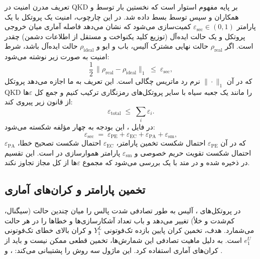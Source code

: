 تعریف مدرن امنیت در QKD بر پایه مفهوم  استوار است که نخستین بار توسط  و همکاران و سپس توسط  بسط داده شد. در این چارچوب، امنیت یک پروتکل با یک پارامتر $\varepsilon_{\text{sec}} \in (0,1)$ کمیت‌سازی می‌شود که نشان می‌دهد فاصله آماری میان خروجی پروتکل و یک حالت ایده‌آل (توزیع کلید یکنواخت و مستقل از اطلاعات دشمن) چقدر است. اگر $\rho_{\text{real}}$ حالت نهایی مشترک آلیس، باب و ایو و $\rho_{\text{ideal}}$ حالت ایده‌آل باشد، شرط امنیت به صورت زیر نوشته می‌شود:
\begin{equation}
	\frac{1}{2}\,\|\rho_{\text{real}} - \rho_{\text{ideal}}\|_1 \;\le\; \varepsilon_{\text{sec}},
\end{equation}
که در آن $\|\cdot\|_1$ نرم رد ماتریس چگالی است. این تعریف به ما اجازه می‌دهد پروتکل QKD را مانند یک جعبه سیاه با سایر پروتکل‌های رمزنگاری ترکیب کنیم و جمع کل $\varepsilon$ها از قانون زیر پیروی کند:
\begin{equation}
	\varepsilon_{\text{total}} \;\le\; \sum_i \varepsilon_i.
\end{equation}
در فایل ، این بودجه به چهار مؤلفه شکسته می‌شود:
\begin{equation}
	\varepsilon_{\text{sec}} \;=\; \varepsilon_{\text{PE}} + \varepsilon_{\text{EC}} + \varepsilon_{\text{PA}} + \varepsilon_{\text{sm}},
\end{equation}
که در آن $\varepsilon_{\text{PE}}$ احتمال شکست تخمین پارامتر، $\varepsilon_{\text{EC}}$ احتمال شکست تصحیح خطا، $\varepsilon_{\text{PA}}$ احتمال شکست تقویت حریم خصوصی و $\varepsilon_{\text{sm}}$ پارامتر هموارسازی در  است. این تقسیم در  ذخیره شده و در متد  با یک  بررسی می‌شود که مجموع $\varepsilon$ها از کل مجاز تجاوز نکند.

\subsection{تخمین پارامتر و کران‌های آماری}

در پروتکل‌های ، آلیس به طور تصادفی شدت پالس را میان چندین حالت (سیگنال،  کم‌شدت و خلأ) تغییر می‌دهد و باب تعداد آشکارسازی‌ها و خطاها را در هر حالت می‌شمارد. هدف، تخمین کران پایین بازده تک‌فوتونی $Y_1^L$ و کران بالای خطای تک‌فوتونی $e_1^U$ است. به دلیل ماهیت تصادفی این شمارش‌ها، تخمین قطعی ممکن نیست و باید از کران‌های آماری استفاده کرد. این ماژول سه روش را پشتیبانی می‌کند: ،  و .

